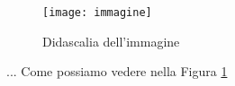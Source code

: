 \begin{figure}[H]
	\centering
	\texttt{[image: immagine]}
	\caption{Didascalia dell'immagine}
	\label{fig:nomedescrittivo}
\end{figure}
...
Come possiamo vedere nella Figura
\ref{fig:nomedescrittivo}